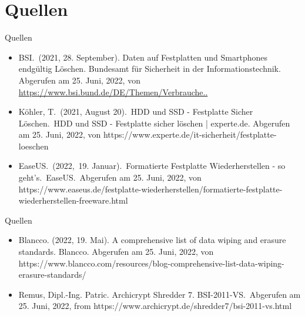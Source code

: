 \documentclass[aspectratio=169]{beamer}
\begin{document}
\section{Quellen}
\begin{frame}{Quellen}
	\begin{itemize}
		\item BSI.\ (2021, 28. September). Daten auf Festplatten und Smartphones
			endgültig Löschen. Bundesamt für Sicherheit in der
			Informationstechnik. Abgerufen am 25. Juni, 2022, von
			\href{https://www.bsi.bund.de/DE/Themen/Verbraucherinnen-und-Verbraucher/Informationen-und-Empfehlungen/Cyber-Sicherheitsempfehlungen/Daten-sichern-verschluesseln-und-loeschen/Daten-endgueltig-loeschen/daten-endgueltig-loeschen_node.html}{https://www.bsi.bund.de/DE/Themen/Verbrauche..}
		\item Köhler, T.\ (2021, August 20).\ HDD und SSD - Festplatte Sicher
			Löschen.\ HDD und SSD - Festplatte sicher löschen | experte.de.
			Abgerufen am 25. Juni, 2022, von
			https://www.experte.de/it-sicherheit/festplatte-loeschen
		\item EaseUS.\ (2022,\ 19. Januar).\ Formatierte Festplatte
			Wiederherstellen - so geht's.\ EaseUS.\ Abgerufen am 25. Juni, 2022,
			von
			https://www.easeus.de/festplatte-wiederherstellen/formatierte-festplatte-wiederherstellen-freeware.html 
	\end{itemize}
\end{frame}

\begin{frame}{Quellen}
	\begin{itemize}
		\item Blancco. (2022, 19. Mai). A comprehensive list of data wiping and
			erasure standards. Blancco. Abgerufen am 25. Juni, 2022, von
			https://www.blancco.com/resources/blog-comprehensive-list-data-wiping-erasure-standards/
		\item Remus, Dipl.-Ing. Patric. Archicrypt Shredder 7. BSI-2011-VS.\
			Abgerufen am 25. Juni, 2022, from
			https://www.archicrypt.de/shredder7/bsi-2011-vs.html
	\end{itemize}
\end{frame}
\end{document}
